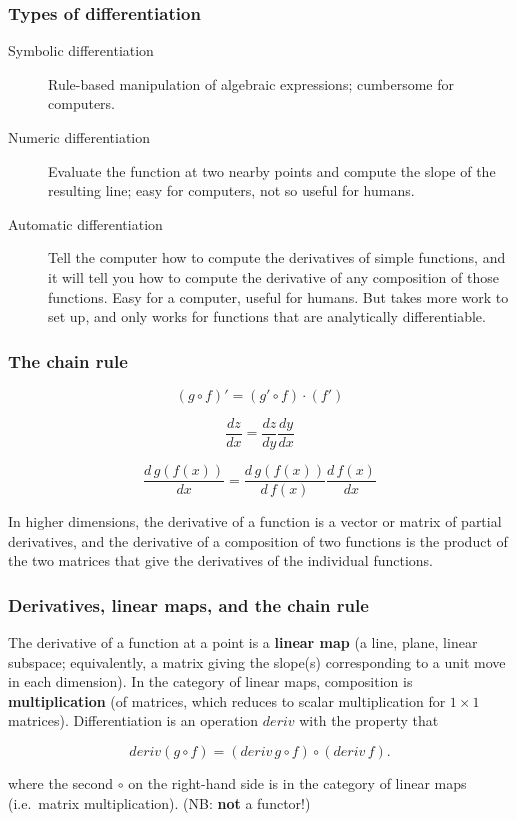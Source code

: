\documentclass[10pt]{beamer}
\theoremstyle{definition}
\theoremstyle{remark}
\numberwithin{equation}{section}
\begin{document}
\begin{frame}[fragile]
  \frametitle{Types of differentiation}

  \begin{description}
  \item[Symbolic differentiation] Rule-based manipulation of algebraic
    expressions; cumbersome for computers.
  \item[Numeric differentiation] Evaluate the function at two nearby points and
    compute the slope of the resulting line; easy for computers, not so useful
    for humans.
  \item[Automatic differentiation] Tell the computer how to compute the
    derivatives of simple functions, and it will tell you how to compute the
    derivative of any composition of those functions. Easy for a computer,
    useful for humans. But takes more work to set up, and only works for
    functions that are analytically differentiable.
  \end{description}
\end{frame}

\begin{frame}[fragile]
  \frametitle{The chain rule}

  \[(g \circ f)' = (g' \circ f) \cdot (f')\]

  \[\frac{dz}{dx} = \frac{dz}{dy} \frac{dy}{dx}\]

  \[\frac{d\,g(f(x))}{dx} = \frac{d\,g(f(x))}{d\,f(x)} \frac{d\,f(x)}{dx}\]

  In higher dimensions, the derivative of a function is a vector or matrix of
  partial derivatives,
  and the derivative of a composition of two functions is the product of the two
  matrices that give the derivatives of the individual functions.

\end{frame}

\begin{frame}[fragile]
  \frametitle{Derivatives, linear maps, and the chain rule}
  
  The derivative of a function at a point is a \textbf{linear map} (a line,
  plane, linear subspace; equivalently, a matrix giving the slope(s)
  corresponding to a unit move in each dimension). In the category of linear
  maps, composition is \textbf{multiplication} (of matrices, which reduces to
  scalar multiplication for $1 \times 1$ matrices). Differentiation is an operation
  $deriv$ with the property that

  \[
    deriv(g \circ f) = (deriv\, g \circ f) \circ (deriv\, f).
  \]

  where the second $\circ$ on the right-hand side is in the category of linear maps
  (i.e.\ matrix multiplication). {\small (NB: \textbf{not} a functor!)}
  
\end{frame}
\end{document}
